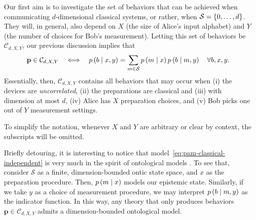             Our first aim is to investigate the set of behaviors that can be achieved when communicating $d$-dimensional classical systems, or rather, when  $\mathcal{S} = \{ 0, \ldots, d \}$. They will, in general, also depend on $X$ (the size of Alice's input alphabet) and $Y$ (the number of choices for Bob's measurement). Letting this set of behaviors be $\mathcal{C}_{d,X,Y}$, our previous discussion implies that
            \begin{equation}
                \mathbf{p} \in \mathcal{C}_{d,X,Y} \quad\Longleftrightarrow \quad p \left( b \mid x,y \right) = \sum_{m \in \mathcal{S}} p \left( m \mid x \right) p \left( b \mid m,y \right) \quad\forall b,x,y .
                \label{eq:pam-classical-independent}
            \end{equation}
            Essentially, then, $\mathcal{C}_{d,X,Y}$ contains all behaviors that may occur when (i) the devices are \emph{uncorrelated}, (ii) the preparations are classical and (iii) with dimension at most $d$, (iv) Alice has $X$ preparation choices, and (v) Bob picks one out of $Y$ measurement settings.
            
            To simplify the notation, whenever $X$ and $Y$ are arbitrary or clear by context, the subscripts will be omitted.
            
            Briefly detouring, it is interesting to notice that model~\eqref{eq:pam-classical-independent} is very much in the spirit of ontological models \cite{spekkens_2005_contextuality,harrigan_2008_ontological,galvao_2009_economical}. To see that, consider $\mathcal{S}$ as a finite, dimension-bounded ontic state space, and $x$ as the preparation procedure. Then, $p \left( m \mid x \right)$ models our epistemic state. Similarly, if we take $y$ as a choice of measurement procedure, we may interpret $p \left( b \mid m,y \right)$ as the indicator function. In this way, any theory that only produces behaviors $\mathbf{p} \in \mathcal{C}_{d,X,Y}$ admits a dimension-bounded ontological model.
            
